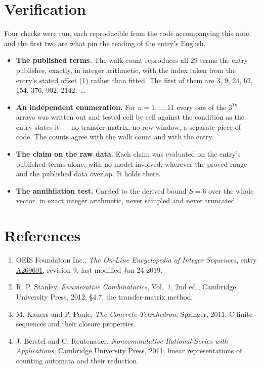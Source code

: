 \documentclass[11pt]{article}
\theoremstyle{definition}
\begin{document}
\section{Verification}

Four checks were run, each reproducible from the code accompanying this note, and the first two are what pin the reading of the entry's English.

\begin{itemize}

\item {\bfseries The published terms.} The walk count reproduces all 29 terms the entry publishes, exactly, in integer arithmetic, with the index taken from the entry's stated offset (1) rather than fitted. The first of them are 3, 9, 24, 62, 154, 376, 902, 2142,~\dots

\item {\bfseries An independent enumeration.} For $n = 1,\dots,11$ every one of the $3^{1n}$ arrays was written out and tested cell by cell against the condition as the entry states it --- no transfer matrix, no row window, a separate piece of code. The counts agree with the walk count and with the entry.

\item {\bfseries The claim on the raw data.} Each claim was evaluated on the entry's published terms alone, with no model involved, wherever the proved range and the published data overlap. It holds there.

\item {\bfseries The annihilation test.} Carried to the derived bound $S = 6$ over the whole vector, in exact integer arithmetic, never sampled and never truncated.

\end{itemize}

\section{References}

\begin{enumerate}

\item OEIS Foundation Inc., \emph{The On-Line Encyclopedia of Integer Sequences}, entry \href{https://oeis.org/A269601}{A269601}, revision 9, last modified Jan 24 2019.

\item R. P. Stanley, \emph{Enumerative Combinatorics}, Vol.~1, 2nd ed., Cambridge University Press, 2012; \S4.7, the transfer-matrix method.

\item M. Kauers and P. Paule, \emph{The Concrete Tetrahedron}, Springer, 2011; C-finite sequences and their closure properties.

\item J. Berstel and C. Reutenauer, \emph{Noncommutative Rational Series with Applications}, Cambridge University Press, 2011; linear representations of counting automata and their reduction.

\end{enumerate}
\end{document}
